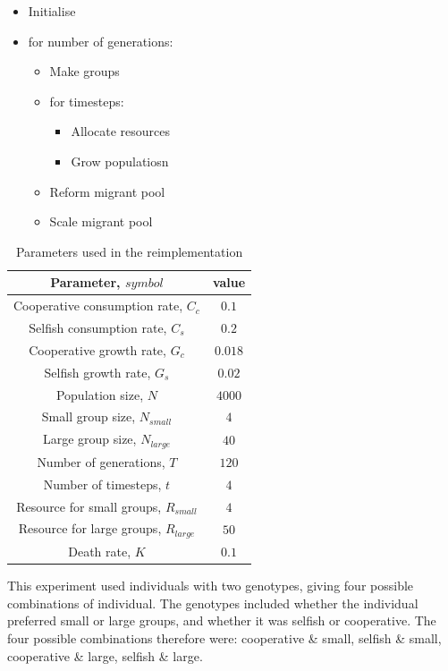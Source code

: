 \documentclass[11pt]{ecsarticle}
\begin{document}
\begin{itemize}
 \item Initialise
 \item for number of generations:
 \begin{itemize}
  \item Make groups
  \item for timesteps:
  \begin{itemize}
   \item Allocate resources
   \item Grow populatiosn
  \end{itemize}
  \item Reform migrant pool
  \item Scale migrant pool
 \end{itemize}
\end{itemize}

\begin{table}[b]
\centering
 \caption{Parameters used in the reimplementation}
 \label{table:params}
 \begin{tabular}{|c|c|}\hline
 Parameter, $symbol$ & value \\ \hline
  Cooperative consumption rate, $C_c$	&	$0.1$		\\ 
  Selfish consumption rate, $C_s$	&	$0.2$		\\ 
  Cooperative growth rate, $G_c$	&	$0.018$		\\ 
  Selfish growth rate, $G_s$		&	$0.02$		\\ 
  Population size, $N$			&	$4000$		\\ 
  Small group size, $N_{small}$	&	$4$		\\ 
  Large group size, $N_{large}$	&	$40$		\\ 
  Number of generations, $T$		&	$120$		\\ 
  Number of timesteps, $t$		&	$4$		\\ 
  Resource for small groups, $R_{small}$&	$4$		\\ 
  Resource for large groups, $R_{large}$&	$50$		\\ 
  Death rate, $K$			&	$0.1$		\\ \hline
 \end{tabular}
\end{table}

This experiment used individuals with two genotypes, giving four possible combinations of individual.
The genotypes included whether the individual preferred small or large groups, and whether it was selfish or cooperative.
The four possible combinations therefore were: cooperative \& small, selfish \& small, cooperative \& large, selfish \& large. 
\end{document}
